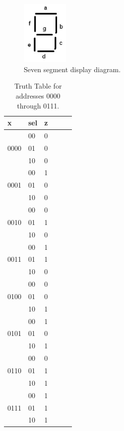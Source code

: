 \documentclass[11pt]{article}
\begin{document}
\begin{figure}[H]
\begin{center}
	\includegraphics[width=0.2\textwidth]{../../Lab2/report-images/img1.png}
	\caption{\label{fig:sevenSeg}Seven segment display diagram.}
\end{center}
\end{figure}

\begin{minipage}[t]{0.4\textwidth}
\begin{table}[H]
\begin{center}
\begin{tabular}{| l | l | l | l | l | l |}
	\hline
	x & sel & z \\ \hline
	\multirow{3}{*}{0000} & 00 & 0 \\
	& 01 & 0 \\
	& 10 & 0 \\ \hline
	\multirow{3}{*}{0001} & 00 & 1 \\
	& 01 & 0 \\
	& 10 & 0 \\ \hline
	\multirow{3}{*}{0010} & 00 & 0 \\
	& 01 & 1 \\
	& 10 & 0 \\ \hline
	\multirow{3}{*}{0011} & 00 & 1 \\
	& 01 & 1 \\
	& 10 & 0 \\ \hline
	\multirow{3}{*}{0100} & 00 & 0 \\
	& 01 & 0 \\
	& 10 & 1 \\ \hline
	\multirow{3}{*}{0101} & 00 & 1 \\
	& 01 & 0 \\
	& 10 & 1 \\ \hline
	\multirow{3}{*}{0110} & 00 & 0 \\
	& 01 & 1 \\
	& 10 & 1 \\ \hline
	\multirow{3}{*}{0111} & 00 & 1 \\
	& 01 & 1 \\
	& 10 & 1 \\ \hline

\end{tabular}
\caption{\label{tab:romMuxTruthTable1}Truth Table for addresses 0000 through 0111.}
\end{center}
\end{table}
\end{minipage}
\end{document}
